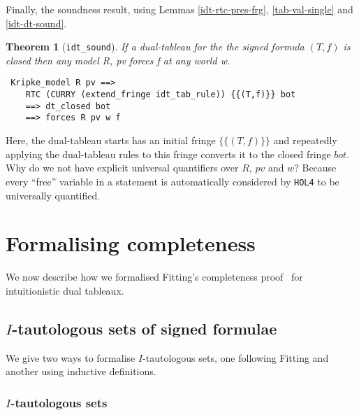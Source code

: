 \documentclass[a4paper]{article}
\newtheorem{theorem}{Theorem}
\newcommand{\hol}{\texttt{HOL4}}
\begin{document}
Finally, the soundness result, using 
Lemmas \ref{idt-rtc-pres-frg}, \ref{tab-val-single} and \ref{idt-dt-sound}.

\begin{theorem}[\texttt{idt\_sound}] \label{idt-sound}
If a dual-tableau for the the signed formula $(T,f)$ is closed
then any model \textit{R, pv} forces \textit{f} at any world
\textit{w}.
\begin{verbatim}
 Kripke_model R pv ==>
    RTC (CURRY (extend_fringe idt_tab_rule)) {{(T,f)}} bot 
    ==> dt_closed bot 
    ==> forces R pv w f
\end{verbatim}
\end{theorem}

Here, the dual-tableau starts has an  initial
fringe $\{\{(T,f)\}\}$ and repeatedly applying the dual-tableau rules
to this fringe converts it to the closed fringe $bot$.
Why do we not have explicit universal quantifiers over $R$, $pv$ and
$w$? Because every ``free'' variable in a statement is automatically
considered by \hol{} to be universally quantified.

\section{Formalising completeness} %

We now describe how we formalised Fitting's completeness
proof~\cite[Section~1.3.3]{fitting-dual-tableau} for intuitionistic
dual tableaux.

\subsection{$I$-tautologous sets of signed formulae}

We give two ways to formalise $I$-tautologous sets, one following Fitting
and another using inductive definitions.

\subsubsection{$I$-tautologous sets }
\end{document}
